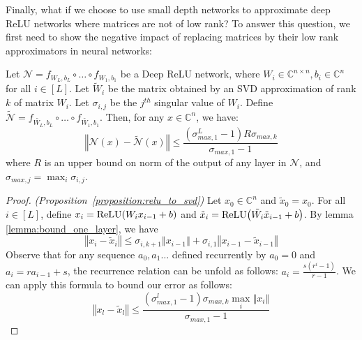 Finally, what if we choose to use small depth networks to approximate deep ReLU networks where matrices are not of low rank?
To answer this question, we first need to show the negative impact of replacing matrices by their low rank approximators in neural networks:

\begin{proposition} \label{proposition:relu_to_svd}
Let $\mathcal{N} = f_{W_{L},b_{L}} \circ \ldots \circ f_{W_{1},b_{1}}$ be a Deep ReLU network, where $W_{i} \in \mathbb{C}^{n \times n}, b_{i} \in \mathbb{C}^{n}$ for all $i \in [L]$. Let $\tilde{W}_{i}$ be the matrix obtained by an SVD approximation of rank $k$ of matrix $W_{i}$. Let $\sigma_{i,j}$ be the $j^{th}$ singular value of $W_{i}$. Define $\tilde{\mathcal{N}} = f_{\tilde{W_{L}},b_{L}} \circ \ldots \circ f_{\tilde{W_{1}},b_{1}}$. Then, for any $x \in \mathbb{C}^{n}$, we have:
\begin{equation}
\left \Vert \mathcal{N}\left(x\right)-\tilde{\mathcal{N}}\left(x\right)\right\Vert \le\frac{\left(\sigma_{max,1}^{L}-1\right)R\sigma_{max,k}}{\sigma_{max,1}-1}
\end{equation}
where $R$ is an upper bound on norm of the output of any layer in $\mathcal{N}$, and $\sigma_{max,j}=\max_{i}\sigma_{i,j}$.
\end{proposition}

\begin{proof} \emph{(Proposition~\ref{proposition:relu_to_svd})}
Let $x_{0} \in \mathbb{C}^{n}$ and $\tilde{x}_{0} = x_{0}$.
For all $i \in [L]$, define $x_{i} = \relu \left(W_{i} x_{i-1} + b \right)$ and $\tilde{x}_{i} = \relu \left( \tilde{W_{i}} \tilde{x}_{i-1} + b \right)$.
By lemma \ref{lemma:bound_one_layer}, we have 
\begin{equation}
  \left\Vert x_{i}-\tilde{x}_{i}\right\Vert \le\sigma_{i,k+1}\left\Vert x_{i-1}\right\Vert +\sigma_{i,1}\left\Vert x_{i-1}-\tilde{x}_{i-1}\right\Vert 
\end{equation}
Observe that for any sequence $a_{0},a_{1}\ldots$ defined recurrently by $a_{0}=0$ and $a_{i}=ra_{i-1}+s$, the recurrence relation can be unfold as follows: $a_{i}=\frac{s\left(r^{i}-1\right)}{r-1}$.
We can apply this formula to bound our error as follows:
\begin{equation}
  \left\Vert x_{l} - \tilde{x}_{l} \right\Vert \le\frac{ \left( \sigma_{max,1}^{l} - 1 \right) \sigma_{max,k} \max_{i} \left\Vert x_{i} \right\Vert }{\sigma_{max,1}-1}
\end{equation}
\end{proof}

